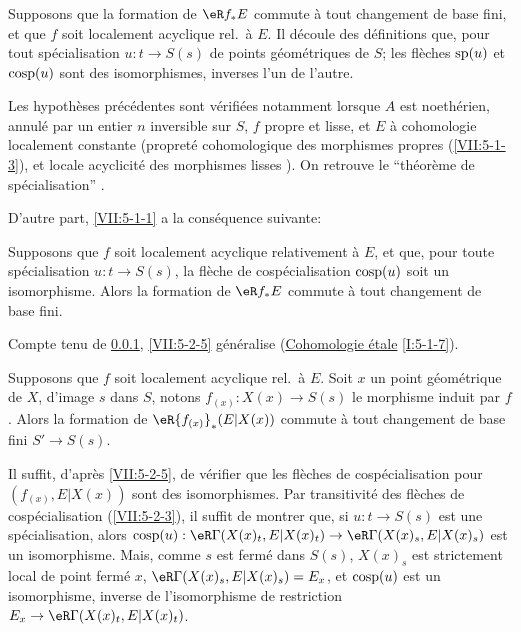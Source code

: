 \subsubsection{}\label{VII:5-2-4}

Supposons que la formation de $\eR f_\ast E$ commute à tout changement de 
base fini, et que $f$ soit localement acyclique rel.\ à $E$. Il découle des 
définitions que, pour tout spécialisation $u:t\to S(s)$ de points 
géométriques de $S$; les flèches $\operatorname{sp}(u)$ et $\operatorname{cosp}(u)$ sont des 
isomorphismes, inverses l'un de l'autre. 

Les hypothèses précédentes sont vérifiées notamment lorsque $A$ est 
noethérien, annulé par un entier $n$ inversible sur $S$, $f$ propre et 
lisse, et $E$ à cohomologie localement constante (propreté cohomologique 
des morphismes propres (\ref{VII:5-1-3}), et locale acyclicité des morphismes 
lisses \cite[XV]{sga4}). On retrouve le ``théorème de spécialisation'' 
\cite[XVI 2.1]{sga4}. 

D'autre part, \ref{VII:5-1-1} a la conséquence suivante: 





\begin{proposition}\label{VII:5-2-5}
Supposons que $f$ soit localement acyclique relativement à $E$, et que, pour 
toute spécialisation $u:t\to S(s)$, la flèche de cospécialisation 
$\operatorname{cosp}(u)$ soit un isomorphisme. Alors la formation de $\eR f_\ast E$ commute 
à tout changement de base fini. 
\end{proposition}

Compte tenu de \ref{VII:5-2-4}, \ref{VII:5-2-5} généralise 
(\hyperref[I]{Cohomologie étale} \ref{I:5-1-7}). 





\begin{corollary}\label{VII:5-2-6}
Supposons que $f$ soit localement acyclique rel.\ à $E$. Soit $x$ un point 
géométrique de $X$, d'image $s$ dans $S$, notons $f_{(x)}:X(x)\to S(s)$ le 
morphisme induit par $f$. Alors la formation de $\eR {f_{(x)}}_\ast(E|X(x))$ 
commute à tout changement de base fini $S'\to S(s)$. 
\end{corollary}

Il suffit, d'après \ref{VII:5-2-5}, de vérifier que les flèches de 
cospécialisation pour $(f_{(x)},E|X(x))$ sont des isomorphismes. Par 
transitivité des flèches de cospécialisation (\ref{VII:5-2-3}), il suffit 
de montrer que, si $u:t\to S(s)$ est une spécialisation, alors 
$\cosp(u):\eR\Gamma(X(x)_t,E|X(x)_t)\to \eR\Gamma(X(x)_s,E|X(x)_s)$ est un 
isomorphisme. Mais, comme $s$ est fermé dans $S(s)$, $X(x)_s$ est strictement 
local de point fermé $x$, $\eR\Gamma(X(x)_s,E|X(x)_s)=E_x$, et 
$\operatorname{cosp}(u)$ est un isomorphisme, inverse de l'isomorphisme de restriction 
$E_x\to \eR\Gamma(X(x)_t,E|X(x)_t)$. 





